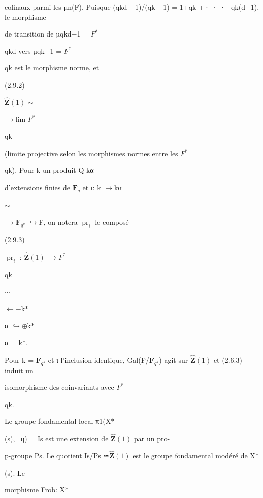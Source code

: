 \documentclass[11pt]{article}
\begin{document}
\noindent cofinaux parmi les µn(F). Puisque (qkd −1)/(qk −1) = 1+qk +· · ·+qk(d−1), le morphisme\par
\noindent de transition de µqkd−1 = \(F^*\)\par
\noindent qkd vers µqk−1 = \(F^*\)\par
\noindent qk est le morphisme norme, et\par
\noindent (2.9.2)\par
\noindent \(\widehat{\mathbf Z}(1)\) \(\sim\)\par
\noindent \(\to\)lim \(F^*\)\par
\noindent qk\par
\noindent (limite projective selon les morphismes normes entre les \(F^*\)\par
\noindent qk). Pour k un produit Q kα\par
\noindent d’extensions finies de \(\mathbf F_q\) et ι: k \(\to\)kα\par
\noindent \(\sim\)\par
\noindent \(\to\)\(\mathbf F_{q^k}\) \(\hookrightarrow\)F, on notera \(\operatorname{pr}_i\) le composé\par
\noindent (2.9.3)\par
\noindent \(\operatorname{pr}_i\) : \(\widehat{\mathbf Z}(1)\) \(\to\)\(F^*\)\par
\noindent qk\par
\noindent \(\sim\)\par
\noindent \(\leftarrow\)−k\(*\)\par
\noindent α \(\hookrightarrow\)\(\oplus\)k\(*\)\par
\noindent α = k\(*\).\par
\noindent Pour k = \(\mathbf F_{q^k}\) et ι l’inclusion identique, Gal(F/\(\mathbf F_{q^k}\)) agit sur \(\widehat{\mathbf Z}(1)\) et (2.6.3) induit un\par
\noindent isomorphisme des coinvariants avec \(F^*\)\par
\noindent qk.\par
\noindent Le groupe fondamental local π1(X\(*\)\par
\noindent (s), ¯η) = Is est une extension de \(\widehat{\mathbf Z}(1)\) par un pro-\par
\noindent p-groupe Ps. Le quotient Is/Ps ≃\(\widehat{\mathbf Z}(1)\) est le groupe fondamental modéré de X\(*\)\par
\noindent (s). Le\par
\noindent morphisme Frob: X\(*\)\par
\end{document}
